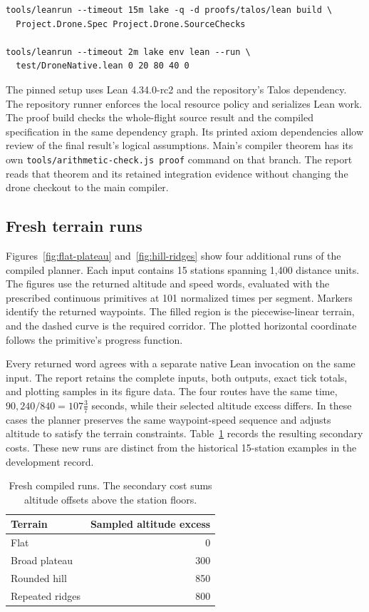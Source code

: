 \documentclass[11pt]{article}
\begin{document}
\begin{lstlisting}
tools/leanrun --timeout 15m lake -q -d proofs/talos/lean build \
  Project.Drone.Spec Project.Drone.SourceChecks

tools/leanrun --timeout 2m lake env lean --run \
  test/DroneNative.lean 0 20 80 40 0
\end{lstlisting}

The pinned setup uses Lean 4.34.0-rc2 and the repository's Talos dependency.  The repository runner enforces the local resource policy and serializes Lean work.  The proof build checks the whole-flight source result and the compiled specification in the same dependency graph.  Its printed axiom dependencies allow review of the final result's logical assumptions.  Main's compiler theorem has its own \texttt{tools/arithmetic-check.js proof} command on that branch.  The report reads that theorem and its retained integration evidence without changing the drone checkout to the main compiler.


\subsection{Fresh terrain runs}

Figures~\ref{fig:flat-plateau} and~\ref{fig:hill-ridges} show four additional runs of the compiled planner.  Each input contains 15 stations spanning 1,400 distance units.  The figures use the returned altitude and speed words, evaluated with the prescribed continuous primitives at 101 normalized times per segment.  Markers identify the returned waypoints.  The filled region is the piecewise-linear terrain, and the dashed curve is the required corridor.  The plotted horizontal coordinate follows the primitive's progress function.

Every returned word agrees with a separate native Lean invocation on the same input.  The report retains the complete inputs, both outputs, exact tick totals, and plotting samples in its figure data.  The four routes have the same time, $90{,}240/840=107\tfrac{3}{7}$ seconds, while their selected altitude excess differs.  In these cases the planner preserves the same waypoint-speed sequence and adjusts altitude to satisfy the terrain constraints.  Table~\ref{tab:runs} records the resulting secondary costs.  These new runs are distinct from the historical 15-station examples in the development record.

\begin{table}[htbp]
\centering
\begin{tabular}{lr}
\toprule
Terrain & Sampled altitude excess\\
\midrule
Flat & 0\\
Broad plateau & 300\\
Rounded hill & 850\\
Repeated ridges & 800\\
\bottomrule
\end{tabular}
\caption{Fresh compiled runs.  The secondary cost sums altitude offsets above the station floors.}
\label{tab:runs}
\end{table}
\end{document}
